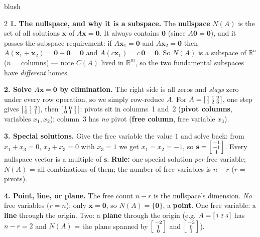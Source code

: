 \documentclass[10pt]{article}
\newcommand{\xx}{\mathbf{x}}
\newcommand{\svec}{\mathbf{s}}
\newcommand{\zero}{\mathbf{0}}
\begin{document}
\begin{skillbox}[Lesson]{blush}
\begin{multicols}{2}
\textbf{1. The nullspace, and why it is a subspace.} The \textbf{nullspace} $N(A)$ is the set of all
solutions $\xx$ of $A\xx=\zero$. It always contains $\zero$ (since $A\zero=\zero$), and it passes the
subspace requirement: if $A\xx_1=\zero$ and $A\xx_2=\zero$ then $A(\xx_1+\xx_2)=\zero+\zero=\zero$ and
$A(c\xx_1)=c\,\zero=\zero$. So $N(A)$ is a subspace of $\mathbb{R}^n$ ($n$ = columns) --- note $C(A)$
lived in $\mathbb{R}^m$, so the two fundamental subspaces have \emph{different} homes.

\textbf{2. Solve $A\xx=\zero$ by elimination.} The right side is all zeros and \emph{stays} zero under
every row operation, so we simply row-reduce $A$. For $A=\begin{bsmallmatrix} 1&1&2\\1&2&3 \end{bsmallmatrix}$,
one step gives $\begin{bsmallmatrix} 1&1&2\\0&1&1 \end{bsmallmatrix}$, then
$\begin{bsmallmatrix} 1&0&1\\0&1&1 \end{bsmallmatrix}$: pivots sit in columns~1 and~2 (\textbf{pivot
columns}, variables $x_1,x_2$); column~3 has \emph{no} pivot (\textbf{free column}, free variable $x_3$).

\columnbreak

\textbf{3. Special solutions.} Give the free variable the value $1$ and solve back: from $x_1+x_3=0$,
$x_2+x_3=0$ with $x_3=1$ we get $x_1=x_2=-1$, so $\svec=\begin{bsmallmatrix} -1\\-1\\1 \end{bsmallmatrix}$.
Every nullspace vector is a multiple of $\svec$. \textbf{Rule:} one special solution \emph{per} free
variable; $N(A)$ = all combinations of them; the number of free variables is $n-r$ ($r$ = pivots).

\textbf{4. Point, line, or plane.} The free count $n-r$ is the nullspace's dimension. \emph{No} free
variables ($r=n$): only $\xx=\zero$, so $N(A)=\{\zero\}$, a \textbf{point}. One free variable: a
\textbf{line} through the origin. Two: a \textbf{plane} through the origin (e.g.
$A=\begin{bsmallmatrix} 1&2&3 \end{bsmallmatrix}$ has $n-r=2$ and $N(A)$ = the plane spanned by
$\begin{bsmallmatrix} -2\\1\\0 \end{bsmallmatrix}$ and $\begin{bsmallmatrix} -3\\0\\1 \end{bsmallmatrix}$).
\end{multicols}
\end{skillbox}
\end{document}
